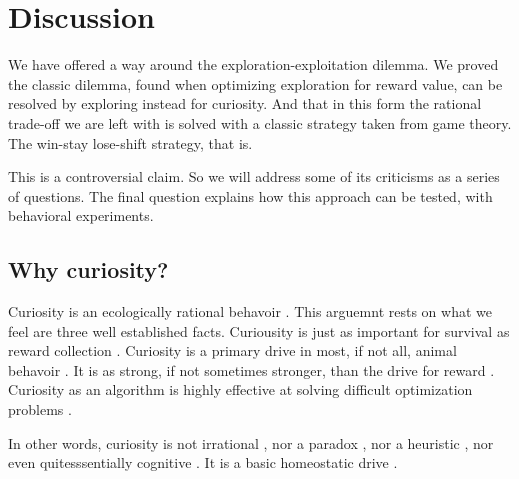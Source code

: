 % 



\section*{Discussion}
We have offered a way around the exploration-exploitation dilemma. We proved the classic dilemma, found when optimizing exploration for reward value, can be resolved by exploring instead for curiosity. And that in this form the rational trade-off we are left with is solved with a classic strategy taken from game theory. The win-stay lose-shift strategy, that is.

This is a controversial claim. So we will address some of its criticisms as a series of questions. The final question explains how this approach can be tested, with behavioral experiments. 

\subsection*{Why curiosity?}
Curiosity is an ecologically rational behavoir \cite{Rich2016a}. This arguemnt rests on what we feel are three well established facts. Curiousity is just as important for survival as reward collection \cite{Thrun1992}. Curiosity is a primary drive in most, if not all, animal behavoir \cite{Inglis2001}. It is as strong, if not sometimes stronger, than the drive for reward \cite{Loewenstein1994,Kidd2015,Gottlieb2018}. Curiosity as an algorithm is highly effective at solving difficult optimization problems \cite{Schmidhuber1991,Pathak2017,Stanton2018,Lehman201,Mouret2011b1,Fister2019,Mouret2015,Colas2020,Cully2015,Pathak2017,Schwartenbeck2019.Laversanne-Finot2018}. 

In other words, curiosity is not irrational \cite{}, nor a paradox \cite{}, nor a heuristic \cite{}, nor even quitesssentially cognitive \cite{Berlyne1950}. It is a basic homeostatic drive \cite{Loewenstein1994}. 


